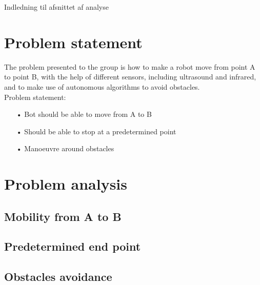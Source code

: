 Indledning til afsnittet af analyse\\

\section{Problem statement}

The problem presented to the group is how to make a robot move from point A to point B, with the help of different sensors, including ultrasound and infrared, and to make use of autonomous algorithms to avoid obstacles. \\

Problem statement:
\begin{enumerate}
\item[•]Bot should be able to move from A to B
\item[•]Should be able to stop at a predetermined point
\item[•]Manoeuvre around obstacles
\end{enumerate}

\section{Problem analysis}
\subsection{Mobility from A to B}
\subsection{Predetermined end point}
\subsection{Obstacles avoidance}
